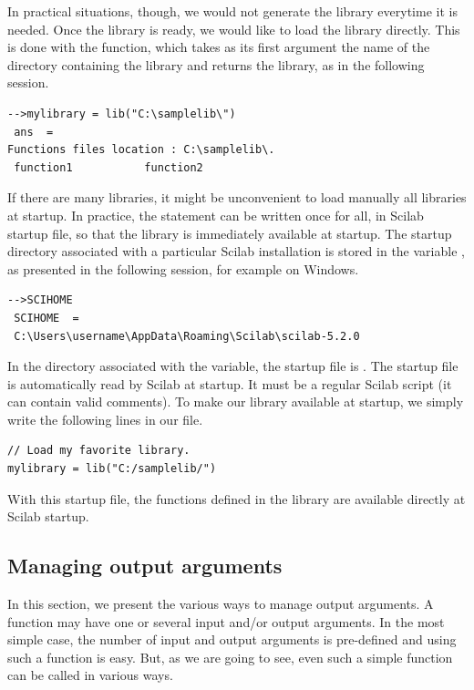 In practical situations, though, we would not generate the library
everytime it is needed. Once the library is ready, we would like to 
load the library directly. This is done with the  
function, which takes as its first argument the name of the directory 
containing the library and returns the library, as in the following session.
\lstset{language=scilabscript}
\begin{lstlisting}
-->mylibrary = lib("C:\samplelib\")
 ans  =
Functions files location : C:\samplelib\.
 function1           function2           
\end{lstlisting}

If there are many libraries, it might be unconvenient to load manually all libraries at 
startup. In practice, the  statement can be written once for all, in Scilab  
startup file, so that the library is immediately available at startup.
The startup directory associated with a particular Scilab installation
is stored in the variable , as presented in the 
following session, for example on Windows.
\lstset{language=scilabscript}
\begin{lstlisting}
-->SCIHOME
 SCIHOME  =
 C:\Users\username\AppData\Roaming\Scilab\scilab-5.2.0   
\end{lstlisting}

In the directory associated with the  variable,
the startup file is . The startup file is 
automatically read by Scilab at startup. It must be a regular Scilab script 
(it can contain valid comments). To make our library available 
at startup, we simply write the following lines 
in our  file.

\lstset{language=scilabscript}
\begin{lstlisting}
// Load my favorite library.
mylibrary = lib("C:/samplelib/")
\end{lstlisting}

With this startup file, the functions defined in the library are 
available directly at Scilab startup.

\subsection{Managing output arguments}

In this section, we present the various ways to manage 
output arguments. 
A function may have one or several input and/or output arguments.
In the most simple case, the number of input and output arguments is 
pre-defined and using such a function is easy. 
But, as we are going to see, even such a simple function
can be called in various ways.

